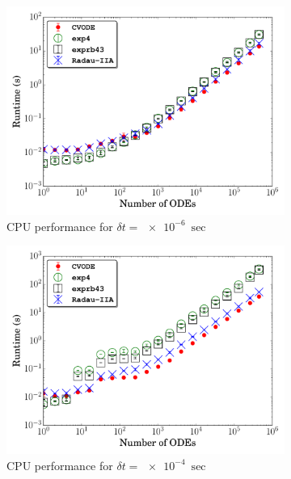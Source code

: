 \documentclass[final,twocolumn]{elsarticle}
\begin{document}
\begin{figure}[htb]
  \ifmeasure
  \fontsize{8pt}{10pt}\selectfont
  \fi
  \centering
  \begin{subfigure}{0.49\textwidth}
      \includegraphics[width=\linewidth]{CH4_1e-06_cpu_nonorm.pdf}
      \caption{CPU performance for $\delta t = \SI{e-6}{\sec}$}
  \end{subfigure}
  \begin{subfigure}{0.49\textwidth}
      \includegraphics[width=\linewidth]{CH4_1e-04_cpu_nonorm.pdf}
      \caption{CPU performance for $\delta t = \SI{e-4}{\sec}$}
  \end{subfigure}\\
  \begin{subfigure}{0.49\textwidth}

\end{subfigure}
\end{figure}
\end{document}
